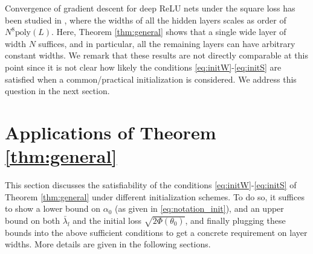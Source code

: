 \documentclass{article}
\begin{document}
Convergence of gradient descent for { deep ReLU nets} under the { square loss} has been studied in \cite{AllenZhuEtal2018,ZouGu2019},
where the widths of all the hidden layers scales as order of $N^8\textrm{poly}(L)$.
Here, Theorem \ref{thm:general} shows that a single wide layer of width $N$ suffices, 
and in particular, all the remaining layers can have arbitrary constant widths.
We remark that these results are not directly comparable at this point since it is not clear 
how likely the conditions \eqref{eq:initW}-\eqref{eq:initS} are satisfied when a common/practical initialization is considered.
We address this question in the next section.
% 

\section{Applications of Theorem \ref{thm:general}}\label{sec:apps}
This section discusses the satisfiability of the conditions \eqref{eq:initW}-\eqref{eq:initS} of Theorem \ref{thm:general}
under different initialization schemes. 
To do so, it suffices to show a lower bound on $\alpha_0$ (as given in \eqref{eq:notation_init}), 
and an upper bound on both $\bar{\lambda}_l$ and the initial loss $\sqrt{2\Phi(\theta_0)}$,
and finally plugging these bounds into the above sufficient conditions to get a concrete requirement on layer widths.
More details are given in the following sections.
\end{document}
